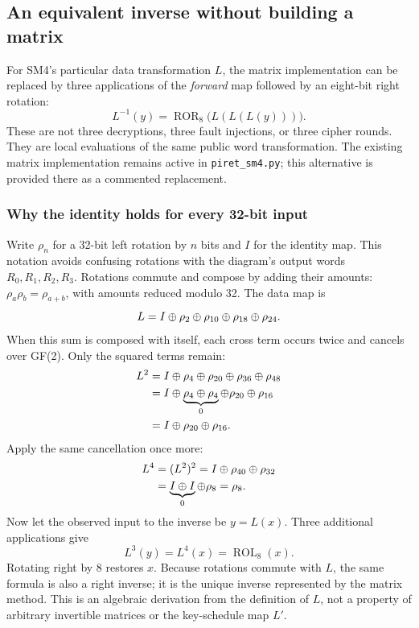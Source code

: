 \subsection{An equivalent inverse without building a matrix}
\label{sec:inverse_without_matrix}
For SM4's particular data transformation $L$, the matrix implementation can be
replaced by three applications of the \emph{forward} map followed by an eight-bit
right rotation:
\[
\boxed{L^{-1}(y)=\operatorname{ROR}_8\bigl(L(L(L(y)))\bigr).}
\]
These are not three decryptions, three fault injections, or three cipher rounds.
They are local evaluations of the same public word transformation.
The existing matrix implementation remains active in \texttt{piret\_sm4.py};
this alternative is provided there as a commented replacement.

\subsubsection*{Why the identity holds for every 32-bit input}
Write $\rho_n$ for a 32-bit left rotation by $n$ bits and $I$ for the identity
map. This notation avoids confusing rotations with the diagram's output words
$R_0,R_1,R_2,R_3$. Rotations commute and compose by adding their amounts:
$\rho_a\rho_b=\rho_{a+b}$, with amounts reduced modulo 32.
The data map is
\[
L=I\mathbin{\oplus}\rho_2\mathbin{\oplus}\rho_{10}\mathbin{\oplus}\rho_{18}\mathbin{\oplus}\rho_{24}.
\]
When this sum is composed with itself, each cross term occurs twice and cancels
over GF(2). Only the squared terms remain:
\[
\begin{aligned}
L^2
&=I\mathbin{\oplus}\rho_4\mathbin{\oplus}\rho_{20}\mathbin{\oplus}\rho_{36}\mathbin{\oplus}\rho_{48}\\
&=I\mathbin{\oplus}\underbrace{\rho_4\mathbin{\oplus}\rho_4}_{0}\mathbin{\oplus}\rho_{20}\mathbin{\oplus}\rho_{16}\\
&=I\mathbin{\oplus}\rho_{20}\mathbin{\oplus}\rho_{16}.
\end{aligned}
\]
Apply the same cancellation once more:
\[
\begin{aligned}
L^4&=(L^2)^2=I\mathbin{\oplus}\rho_{40}\mathbin{\oplus}\rho_{32}\\
&=\underbrace{I\mathbin{\oplus} I}_{0}\mathbin{\oplus}\rho_8=\rho_8.
\end{aligned}
\]
Now let the observed input to the inverse be $y=L(x)$. Three additional
applications give
\[
L^3(y)=L^4(x)=\operatorname{ROL}_8(x).
\]
Rotating right by 8 restores $x$. Because rotations commute with $L$, the same
formula is also a right inverse; it is the unique inverse represented by the
matrix method. This is an algebraic derivation from the definition of $L$,
not a property of arbitrary invertible matrices or the key-schedule map $L'$.

